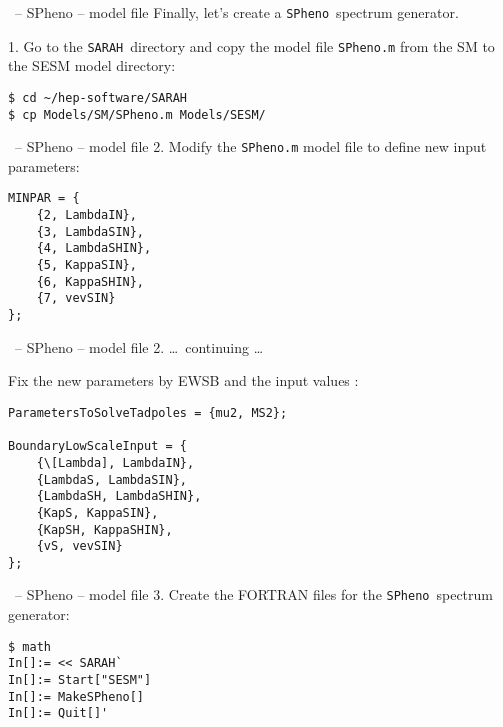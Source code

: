 \documentclass[11pt]{beamer}
\newcommand{\SARAH}{\texttt{SARAH}}
\newcommand{\SPheno}{\texttt{SPheno}}
\begin{document}

\begin{frame}[fragile]{\insertsection\ -- SPheno -- model file}
  Finally, let's create a \SPheno\ spectrum generator.

  \bigskip

  1. Go to the \SARAH\ directory and copy the model file
  \texttt{SPheno.m} from the SM to the SESM model directory:
  \begin{lstlisting}
$ cd ~/hep-software/SARAH
$ cp Models/SM/SPheno.m Models/SESM/\end{lstlisting}%
\end{frame}


\begin{frame}[fragile]{\insertsection\ -- SPheno -- model file}
  2. Modify the \texttt{SPheno.m} model file to define new input
  parameters:
  \begin{lstlisting}
MINPAR = {
    {2, LambdaIN},
    {3, LambdaSIN},
    {4, LambdaSHIN},
    {5, KappaSIN},
    {6, KappaSHIN},
    {7, vevSIN}
};\end{lstlisting}%
\end{frame}


\begin{frame}[fragile]{\insertsection\ -- SPheno -- model file}
  2. \ldots\ continuing \ldots

  \bigskip

  Fix the new parameters by EWSB and the input values :
  \begin{lstlisting}
ParametersToSolveTadpoles = {mu2, MS2};

BoundaryLowScaleInput = {
    {\[Lambda], LambdaIN},
    {LambdaS, LambdaSIN},
    {LambdaSH, LambdaSHIN},
    {KapS, KappaSIN},
    {KapSH, KappaSHIN},
    {vS, vevSIN}
};\end{lstlisting}%
\end{frame}


\begin{frame}[fragile]{\insertsection\ -- SPheno -- model file}
  3. Create the FORTRAN files for the \SPheno\ spectrum generator:
  \begin{lstlisting}
$ math
In[]:= << SARAH`
In[]:= Start["SESM"]
In[]:= MakeSPheno[]
In[]:= Quit[]'\end{lstlisting}%
\end{frame}
\end{document}
